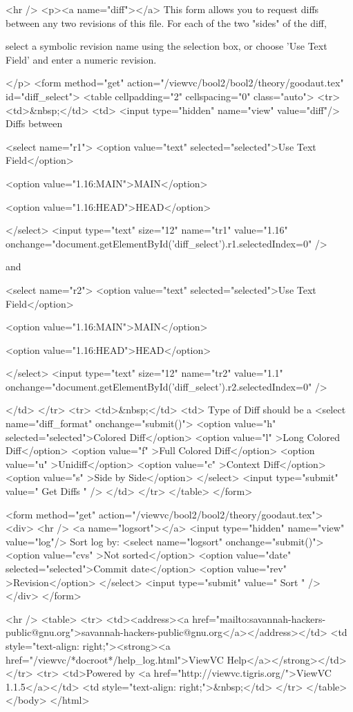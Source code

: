  


 <hr />
<p><a name="diff"></a>
This form allows you to request diffs between any two revisions of this file.
For each of the two "sides" of the diff,

select a symbolic revision name using the selection box, or choose
'Use Text Field' and enter a numeric revision.

</p>
<form method="get" action="/viewvc/bool2/bool2/theory/goodaut.tex" id="diff_select">
<table cellpadding="2" cellspacing="0" class="auto">
<tr>
<td>&nbsp;</td>
<td>
<input type="hidden" name="view" value="diff"/>
Diffs between

<select name="r1">
<option value="text" selected="selected">Use Text Field</option>

<option value="1.16:MAIN">MAIN</option>

<option value="1.16:HEAD">HEAD</option>

</select>
<input type="text" size="12" name="tr1"
value="1.16"
onchange="document.getElementById('diff_select').r1.selectedIndex=0" />

and

<select name="r2">
<option value="text" selected="selected">Use Text Field</option>

<option value="1.16:MAIN">MAIN</option>

<option value="1.16:HEAD">HEAD</option>

</select>
<input type="text" size="12" name="tr2"
value="1.1"
onchange="document.getElementById('diff_select').r2.selectedIndex=0" />

</td>
</tr>
<tr>
<td>&nbsp;</td>
<td>
Type of Diff should be a
<select name="diff_format" onchange="submit()">
<option value="h" selected="selected">Colored Diff</option>
<option value="l" >Long Colored Diff</option>
<option value="f" >Full Colored Diff</option>
<option value="u" >Unidiff</option>
<option value="c" >Context Diff</option>
<option value="s" >Side by Side</option>
</select>
<input type="submit" value=" Get Diffs " />
</td>
</tr>
</table>
</form>



<form method="get" action="/viewvc/bool2/bool2/theory/goodaut.tex">
<div>
<hr />
<a name="logsort"></a>
<input type="hidden" name="view" value="log"/>
Sort log by:
<select name="logsort" onchange="submit()">
<option value="cvs" >Not sorted</option>
<option value="date" selected="selected">Commit date</option>
<option value="rev" >Revision</option>
</select>
<input type="submit" value=" Sort " />
</div>
</form>


<hr />
<table>
<tr>
<td><address><a href="mailto:savannah-hackers-public@gnu.org">savannah-hackers-public@gnu.org</a></address></td>
<td style="text-align: right;"><strong><a href="/viewvc/*docroot*/help_log.html">ViewVC Help</a></strong></td>
</tr>
<tr>
<td>Powered by <a href="http://viewvc.tigris.org/">ViewVC 1.1.5</a></td>
<td style="text-align: right;">&nbsp;</td>
</tr>
</table>
</body>
</html>


